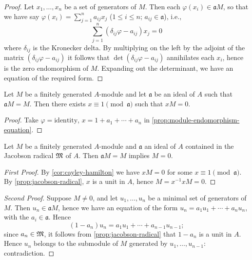 \begin{proof}
    Let $x_1, \ldots, x_n$ be a set of generators of $M$. Then each $\varphi(x_i) \in \mathfrak{a}M$, so that we have say $\varphi(x_i) = \sum_{j=1}^n a_{ij}x_j$ ($1 \leq i \leq n$; $a_{ij} \in \mathfrak{a}$), i.e.,
    \[
        \sum_{j=1}^n (\delta_{ij}\varphi - a_{ij})x_j = 0
    \]
    where $\delta_{ij}$ is the Kronecker delta. By multiplying on the left by the adjoint of the matrix $(\delta_{ij}\varphi - a_{ij})$ it follows that $\det(\delta_{ij}\varphi - a_{ij})$ annihilates each $x_i$, hence is the zero endomorphism of $M$. Expanding out the determinant, we have an equation of the required form.
\end{proof}

\begin{corollary}\label{cor:cayley-hamilton}
    Let $M$ be a finitely generated $A$-module and let $\mathfrak{a}$ be an ideal of $A$ such that $\mathfrak{a}M = M$. Then there exists $x \equiv 1 \pmod{\mathfrak{a}}$ such that $xM = 0$.
\end{corollary}

\begin{proof}
    Take $\varphi = \text{identity}$, $x = 1 + a_1 + \cdots + a_n$ in \eqref{prop:module-endomorphism-equation}.
\end{proof}

\begin{proposition}\label{pro:nakayama}
    Let $M$ be a finitely generated $A$-module and $\mathfrak{a}$ an ideal of $A$ contained in the Jacobson radical $\mathfrak{M}$ of $A$. Then $\mathfrak{a}M = M$ implies $M = 0$.
\end{proposition}

\begin{proof}[First Proof]
    By \eqref{cor:cayley-hamilton} we have $xM = 0$ for some $x \equiv 1 \pmod{\mathfrak{a}}$. By \eqref{prop:jacobson-radical}, $x$ is a unit in $A$, hence $M = x^{-1}xM = 0$.
\end{proof}

\begin{proof}[Second Proof]
    Suppose $M \neq 0$, and let $u_1, \ldots, u_n$ be a minimal set of generators of $M$. Then $u_n \in \mathfrak{a}M$, hence we have an equation of the form $u_n = a_1 u_1 + \cdots + a_n u_n$, with the $a_i \in \mathfrak{a}$. Hence
    \[
        (1 - a_n)u_n = a_1 u_1 + \cdots + a_{n-1}u_{n-1};
    \]
    since $a_n \in \mathfrak{M}$, it follows from \eqref{prop:jacobson-radical} that $1 - a_n$ is a unit in $A$. Hence $u_n$ belongs to the submodule of $M$ generated by $u_1, \ldots, u_{n-1}$: contradiction.
\end{proof}

